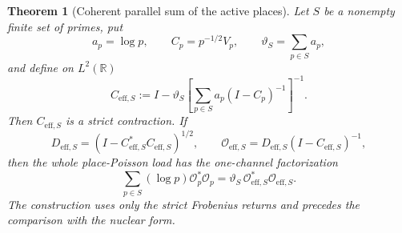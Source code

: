 \documentclass[11pt]{amsart}
\newtheorem{theorem}{Theorem}[section]
\theoremstyle{definition}
\theoremstyle{remark}
\begin{document}
\begin{theorem}[Coherent parallel sum of the active places]
\label{thm:coherentparallelsum}
Let $S$ be a nonempty finite set of primes, put
\[
 a_p=\log p,\qquad C_p=p^{-1/2}V_p,\qquad
 \vartheta_S=\sum_{p\in S}a_p,
\]
and define on $L^2(\mathbb R)$
\begin{equation}\label{eq:effectivefrobeniusreturn}
 C_{\mathrm{eff},S}
 :=I-\vartheta_S\left[
       \sum_{p\in S}a_p(I-C_p)^{-1}\right]^{-1}.
\end{equation}
Then $C_{\mathrm{eff},S}$ is a strict contraction.  If
\[
 D_{\mathrm{eff},S}
   =(I-C_{\mathrm{eff},S}^*C_{\mathrm{eff},S})^{1/2},
 \qquad
 \mathcal O_{\mathrm{eff},S}
   =D_{\mathrm{eff},S}(I-C_{\mathrm{eff},S})^{-1},
\]
then the whole place-Poisson load has the one-channel factorization
\begin{equation}\label{eq:coherentparallelsum}
 \boxed{
 \sum_{p\in S}(\log p)\mathcal O_p^*\mathcal O_p
 =\vartheta_S\,
   \mathcal O_{\mathrm{eff},S}^*
   \mathcal O_{\mathrm{eff},S}.}
\end{equation}
The construction uses only the strict Frobenius returns and precedes the
comparison with the nuclear form.
\end{theorem}
\end{document}
